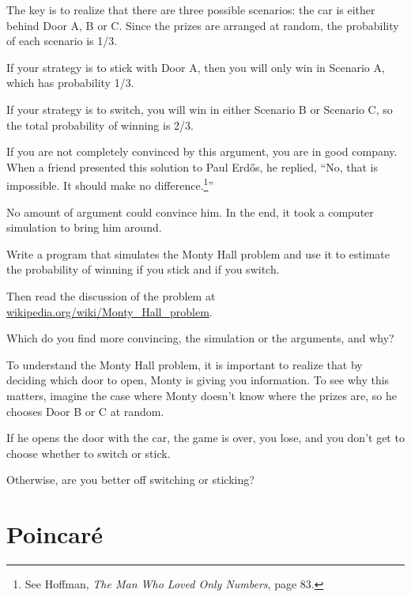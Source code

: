 \documentclass[12pt]{book}
\begin{document}
The key is to realize that there are three possible scenarios:
the car is either behind Door A, B or C.  Since the prizes are
arranged at random, the probability of each scenario is 1/3.

If your strategy is to stick with Door A, then you will only
win in Scenario A, which has probability 1/3.

If your strategy is to switch, you will win in either Scenario
B or Scenario C, so the total probability of winning is 2/3.

\newcommand{\Erdos}{Erd\H{o}s}

If you are not completely convinced by this argument, you are
in good company.  When a friend presented this solution to
Paul \Erdos, he replied, ``No, that is impossible.  It should
make no difference.\footnote{See Hoffman, {\em The Man Who Loved
Only Numbers}, page 83.}''

No amount of argument could convince him.  In the end, it took
a computer simulation to bring him around.

\begin{ex}

Write a program that simulates the Monty Hall problem and use
it to estimate the probability of winning if you stick and if
you switch.

Then read the discussion of the problem at
\url{wikipedia.org/wiki/Monty_Hall_problem}.

Which do you find more convincing, the simulation or the arguments,
and why?

\end{ex}


\begin{ex}

To understand the Monty Hall problem, it is important to realize
that by deciding which door to open, Monty is giving you information.
To see why this matters, imagine the case where Monty doesn't
know where the prizes are, so he chooses Door B or C at random.

If he opens the door with the car, the game is over, you lose, and
you don't get to choose whether to switch or stick.

Otherwise, are you better off switching or sticking?

\end{ex}



\newcommand{\Poincare}{Poincar\'{e}}

\section{\Poincare}
\end{document}
